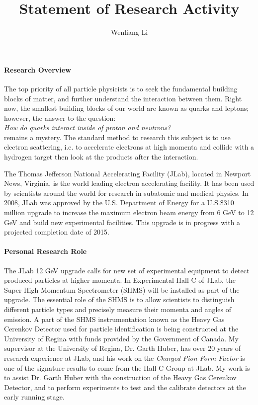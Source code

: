 \documentclass[12pt, letterpaper]{article}
\title{Statement of Research Activity}
\author{Wenliang Li}
\begin{document}
\maketitle
\onehalfspacing

\paragraph{Research Overview}
The top priority of all particle physicists is to seek the fundamental building
blocks of matter, and further understand the interaction between
them. Right now, the smallest building blocks of our world are known as quarks
and leptons; however, the answer to the question:\\
\emph{How do quarks interact inside of proton and neutrons?} \\ 
remains a mystery.  The standard method to research this subject is to use
electron scattering, i.e. to accelerate electrons at high momenta and collide
with a hydrogen target then look at the products after the interaction.

The Thomas Jefferson National Accelerating Facility (JLab), located in Newport
News, Virginia, is the world leading electron accelerating facility.  It has
been used by scientists around the world for research in subatomic and medical
physics. In 2008, JLab was approved by the U.S. Department of Energy for a
U.S.\$310 million upgrade to increase the maximum electron beam energy from 6 GeV to
12 GeV and build new experimental facilities.  This upgrade is in progress
with a projected completion date of 2015.

\paragraph{Personal Research Role}
The JLab 12 GeV upgrade calls for new set of experimental equipment to detect
produced particles at higher momenta.  In Experimental Hall C of JLab, the
Super High Momentum Spectrometer (SHMS) will be installed as part of the
upgrade.  The essential role of the SHMS is to allow scientists to distinguish
different particle types and precisely measure their momenta and angles of
emission. A part of the SHMS instrumentation known as the Heavy Gas Cerenkov
Detector used for particle identification is being constructed at the
University of Regina with funds provided by the Government of Canada.  My
supervisor at the University of Regina, Dr. Garth Huber, has over 20 years of
research experience at JLab, and his work on the \emph{Charged Pion Form
Factor} is one of the signature results to come from the Hall C Group at
JLab. My work is to assist Dr. Garth Huber with the construction of the Heavy
Gas Cerenkov Detector, and to perform experiments to test and the calibrate
detectors at the early running stage.
\end{document}
